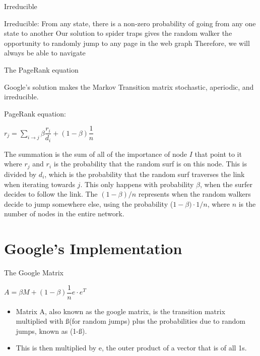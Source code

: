 \documentclass{beamer}
\begin{document}
\begin{frame}[t]{Irreducible}
\begin{outline}
    \1 Irreducible: From any state, there is a non-zero probability of going from any one state to another
    \1 Our solution to spider traps gives the random walker the opportunity to randomly jump to any page in the web graph
    \1 Therefore, we will always be able to navigate 
\end{outline}
\end{frame}

\begin{frame}[t]{The PageRank equation}
\begin{outline}
\1 Google's solution makes the Markov Transition matrix stochastic, aperiodic, and irreducible.

\1 PageRank equation:

\begin{mdframed}[backgroundcolor=blue!20]
    \begin{center}
        $r_j = \sum\limits_{i\to j}\beta \dfrac{r_i}{d_i} + (1-\beta)\dfrac{1}{n}$
    \end{center}
\end{mdframed}

\2 The summation is the sum of all of the importance of node $I$ that point to it where $r_j$ and $r_i$ is the probability that the random surf is on this node.
\2 This is divided by $d_i$, which is the probability that the random surf traverses the link when iterating towards $j$. This only happens with probability $\beta$, when the surfer decides to follow the link.
\2 The $(1-\beta)/n$ represents when the random walkers decide to jump somewhere else, using the probability ($1-\beta) \cdot 1/n$, where $n$ is the number of nodes in the entire network.
\end{outline}
\end{frame}

\section{Google's Implementation}
\begin{frame}[t]{The Google Matrix}
    \begin{mdframed}[backgroundcolor=blue!20]
        \begin{center}
            $A = \beta M + (1-\beta)\dfrac{1}{n}e\cdot e^T$
        \end{center}
    \end{mdframed}
    \begin{itemize}
       
        \item Matrix A, also known as the google matrix, is the transition matrix multiplied with ß(for random jumps) plus the probabilities due to random jumps, known as (1-ß). 
    
    
    \item This is then multiplied by e, the outer product of a vector that is of all 1s.
    \end{itemize}
    \end{frame}
\end{document}
